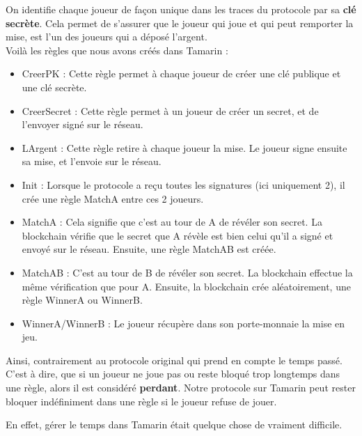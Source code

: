 \documentclass[conference]{IEEEtran}
\begin{document}
On identifie chaque joueur de façon unique dans les traces du protocole par sa \textbf{clé secrète}. Cela permet de s'assurer que le joueur qui joue et qui peut remporter la mise, est l'un des joueurs qui a déposé l'argent.\\
Voilà les règles que nous avons créés dans Tamarin : 
\begin{itemize}
    \item CreerPK : Cette règle permet à chaque joueur de créer une clé publique et une clé secrète.
    \item CreerSecret : Cette règle permet à un joueur de créer un secret, et de l'envoyer signé sur le réseau.
    \item LArgent : Cette règle retire à chaque joueur la mise. Le joueur signe ensuite sa mise, et l'envoie sur le réseau.
    \item Init : Lorsque le protocole a reçu toutes les signatures (ici uniquement 2), il crée une règle MatchA entre ces 2 joueurs.
    \item MatchA : Cela signifie que c'est au tour de A de révéler son secret. La blockchain vérifie que le secret que A révèle est bien celui qu'il a signé et envoyé sur le réseau. Ensuite, une règle MatchAB est créée.
    \item MatchAB : C'est au tour de B de révéler son secret. La blockchain effectue la même vérification que pour A. Ensuite, la blockchain crée aléatoirement, une règle WinnerA ou WinnerB.
    \item WinnerA/WinnerB : Le joueur récupère dans son porte-monnaie la mise en jeu.
\end{itemize}
\vspace{0.3cm}

Ainsi, contrairement au protocole original \cite{955} qui prend en compte le temps passé. C'est à dire, que si un joueur ne joue pas ou reste bloqué trop longtemps dans une règle, alors il est considéré \textbf{perdant}. Notre protocole sur Tamarin peut rester bloquer indéfiniment dans une règle si le joueur refuse de jouer.

En effet, gérer le temps dans Tamarin était quelque chose de vraiment difficile. 
\newpage
\end{document}
